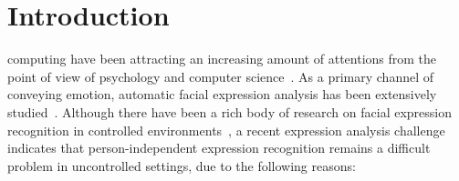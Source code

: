 \documentclass[journal]{IEEEtran}
\begin{document}
%
\IEEEpeerreviewmaketitle



\section{Introduction}

 computing have been attracting an increasing amount of attentions from the point of view of psychology and computer science~\cite{Picard03}. As a primary channel of conveying emotion, automatic facial expression analysis has been extensively studied~\cite{Pantic_PAMI00}\cite{Torre11}. Although there have been a rich body of research on facial expression recognition in controlled environments~\cite{Torre11}, a recent expression analysis challenge~\cite{FERA11} indicates that person-independent expression recognition remains a difficult problem in uncontrolled settings, due to the following reasons:
\end{document}
